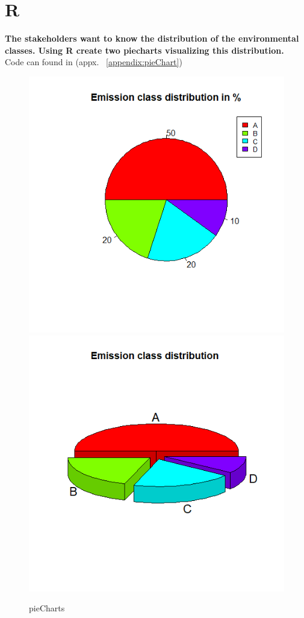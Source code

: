 \documentclass[a4paper]{article}
\begin{document}
\section{R}
\begin{flushleft}
    {\bf The stakeholders want to know the distribution of the environmental classes. Using R create two piecharts visualizing this distribution.} \\ Code can found in (appx. ~\ref{appendix:pieChart})
    \begin{figure} [H]%
        \centering
        {{\includegraphics[width=0.4\linewidth]{assets/pieChart1.png} }}%
        \qquad
        {{\includegraphics[width=0.4\linewidth]{assets/pieChart2.png} }}%
        \caption{pieCharts}%
        \label{fig:pieChart}%
    \end{figure}
\end{flushleft}
\end{document}

